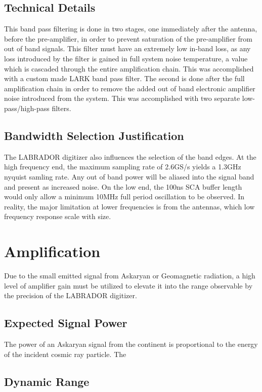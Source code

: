 	\subsection{Technical Details}
		This band pass filtering is done in two stages, one immediately after the antenna, before the pre-amplifier, in order to prevent saturation of the pre-amplifier from out of band signals.  This filter must have an extremely low in-band loss, as any loss introduced by the filter is gained in full system noise temperature, a value which is cascaded through the entire amplification chain.  This was accomplished with a custom made LARK band pass filter.  The second is done after the full amplification chain in order to remove the added out of band electronic amplifier noise introduced from the system.  This was accomplished with two separate low-pass/high-pass filters.
	\subsection{Bandwidth Selection Justification}	
		The LABRADOR digitizer also influences the selection of the band edges.  At the high frequency end, the maximum sampling rate of 2.6GS/s yields a 1.3GHz nyquist samling rate.  Any out of band power will be aliased into the signal band and present as increased noise.\cite{something}  On the low end, the 100ns SCA buffer length would only allow a minimum 10MHz full period oscillation to be observed.  In reality, the major limitation at lower frequencies is from the antennas, which low frequency response scale with size.
		
\section{Amplification}
	Due to the small emitted signal from Askaryan or Geomagnetic radiation, a high level of amplifier gain must be utilized to elevate it into the range observable by the precision of the LABRADOR digitizer.
	\subsection{Expected Signal Power}
		The power of an Askaryan signal from the continent is proportional to the energy of the incident cosmic ray particle.  The 

	\subsection{Dynamic Range}
		
